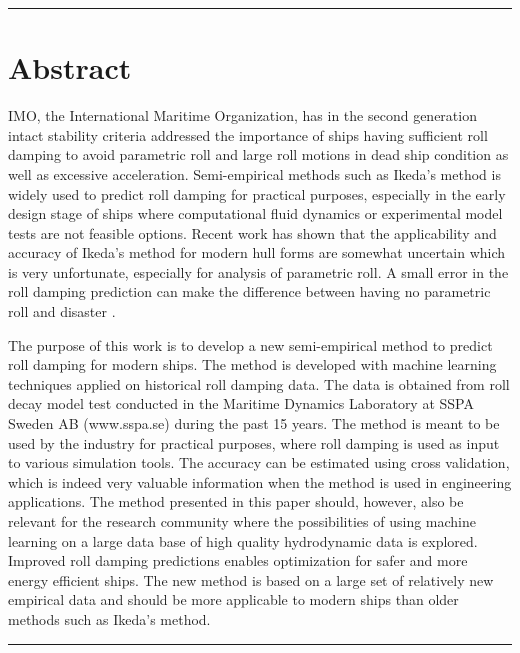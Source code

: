 {\footnotesize
\noindent\rule{\columnwidth}{0.4pt}
\section*{Abstract}\label{se:abstract}
IMO, the International Maritime Organization, has in the second generation intact stability criteria \parencite{imo_finalization_2016} addressed the importance of ships having sufficient roll damping to avoid parametric roll and large roll motions in dead ship condition as well as excessive acceleration. Semi-empirical methods such as Ikeda’s method is widely used to predict roll damping for practical purposes, especially in the early design stage of ships where computational fluid dynamics or experimental model tests are not feasible options. Recent work has shown that the applicability and accuracy of Ikeda’s method for modern hull forms are somewhat uncertain which is very unfortunate, especially for analysis of parametric roll. A small error in the roll damping prediction can make the difference between having no parametric roll and disaster \parencite{soder_ikeda_2019}.

The purpose of this work is to develop a new semi-empirical method to predict roll damping for modern ships. The method is developed with machine learning techniques applied on historical roll damping data. The data is obtained from roll decay model test conducted in the Maritime Dynamics Laboratory at SSPA Sweden AB (www.sspa.se) during the past 15 years. The method is meant to be used by the industry for practical purposes, where roll damping is used as input to various simulation tools. The accuracy can be estimated using cross validation, which is indeed very valuable information when the method is used in engineering applications. The method presented in this paper should, however, also be relevant for the research community where the possibilities of using machine learning on a large data base of high quality hydrodynamic data is explored. Improved roll damping predictions enables optimization for safer and more energy efficient ships. The new method is based on a large set of relatively new empirical data and should be more applicable to modern ships than older methods such as Ikeda’s method.

}
\newline
\noindent\rule{\columnwidth}{0.4pt}